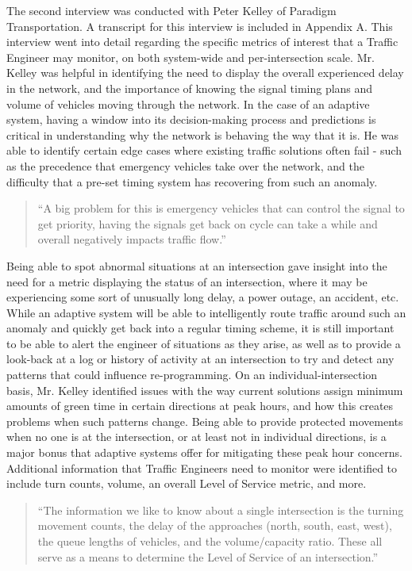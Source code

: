 \documentclass{report}
\begin{document}
The second interview was conducted with Peter Kelley of Paradigm Transportation.
A transcript for this interview is included in Appendix A.
This interview went into detail regarding the specific metrics of interest that a Traffic Engineer may monitor, on both system-wide and per-intersection scale.
Mr. Kelley was helpful in identifying the need to display the overall experienced delay in the network, and the importance of knowing the signal timing plans and volume of vehicles moving through the network.
In the case of an adaptive system, having a window into its decision-making process and predictions is critical in understanding why the network is behaving the way that it is.
He was able to identify certain edge cases where existing traffic solutions often fail - such as the precedence that emergency vehicles take over the network, and the difficulty that a pre-set timing system has recovering from such an anomaly.
\begin{quote}
``A big problem for this is emergency vehicles that can control the signal to get priority, having the signals get back on cycle can take a while and overall negatively impacts traffic flow.''
\end{quote}
Being able to spot abnormal situations at an intersection gave insight into the need for a metric displaying the status of an intersection, where it may be experiencing some sort of unusually long delay, a power outage, an accident, etc.
While an adaptive system will be able to intelligently route traffic around such an anomaly and quickly get back into a regular timing scheme, it is still important to be able to alert the engineer of situations as they arise, as well as to provide a look-back at a log or history of activity at an intersection to try and detect any patterns that could influence re-programming.
On an individual-intersection basis, Mr. Kelley identified issues with the way current solutions assign minimum amounts of green time in certain directions at peak hours, and how this creates problems when such patterns change. 
Being able to provide protected movements when no one is at the intersection, or at least not in individual directions, is a major bonus that adaptive systems offer for mitigating these peak hour concerns. 
Additional information that Traffic Engineers need to monitor were identified to include turn counts, volume, an overall Level of Service metric, and more.
\begin{quote}
``The information we like to know about a single intersection is the turning movement counts, the delay of the approaches (north, south, east, west), the queue lengths of vehicles, and the volume/capacity ratio. These all serve as a means to determine the Level of Service of an intersection.''
\end{quote}
\end{document}
